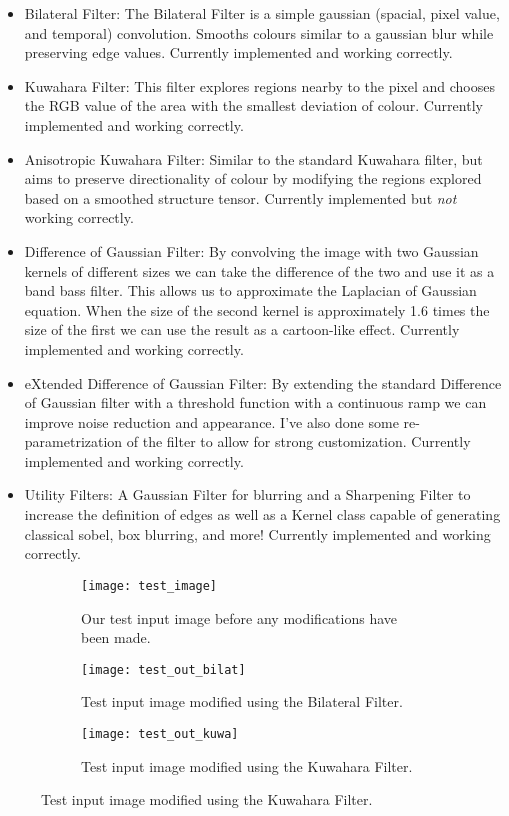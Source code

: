 \documentclass[10pt]{article}
\begin{document}
\begin{itemize}

\item Bilateral Filter: The Bilateral Filter is a simple gaussian (spacial, pixel value, and temporal) convolution. Smooths colours similar to a gaussian blur while preserving edge values. Currently implemented and working correctly.

\item Kuwahara Filter: This filter explores regions nearby to the pixel and chooses the RGB value of the area with the smallest deviation of colour. Currently implemented and working correctly.

\item Anisotropic Kuwahara Filter: Similar to the standard Kuwahara filter, but aims to preserve directionality of colour by modifying the regions explored based on a smoothed structure tensor. Currently implemented but \emph{not} working correctly.

\item Difference of Gaussian Filter: By convolving the image with two Gaussian kernels of different sizes we can take the difference of the two and use it as a band bass filter. This allows us to approximate the Laplacian of Gaussian equation. When the size of the second kernel is approximately 1.6 times the size of the first we can use the result as a cartoon-like effect. Currently implemented and working correctly.

\item eXtended Difference of Gaussian Filter: By extending the standard Difference of Gaussian filter with a threshold function with a continuous ramp we can improve noise reduction and appearance. I've also done some re-parametrization of the filter to allow for strong customization. Currently implemented and working correctly.

\item Utility Filters: A Gaussian Filter for blurring and a Sharpening Filter to increase the definition of edges as well as a Kernel class capable of generating classical sobel, box blurring, and more! Currently implemented and working correctly.
\end{itemize}


\begin{figure}
\centering
\begin{subfigure}[b]{0.45\textwidth}
	\texttt{[image: test\_image]}
	\caption{Our test input image before any modifications have been made.}
\end{subfigure}
\begin{subfigure}[b]{0.45\textwidth}
	\texttt{[image: test\_out\_bilat]}
	\caption{Test input image modified using the Bilateral Filter.}
\end{subfigure}
\begin{subfigure}[b]{0.45\textwidth}
	\texttt{[image: test\_out\_kuwa]}
	\caption{Test input image modified using the Kuwahara Filter.}
\end{subfigure}
\end{figure}
\end{document}
